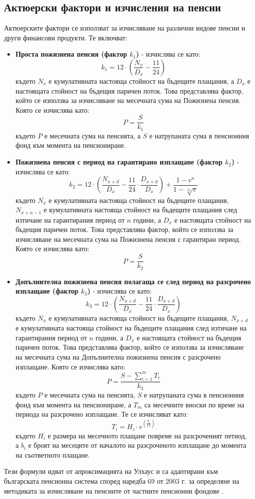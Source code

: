 \documentclass[a4paper,12pt]{article}
\begin{document}
\subsection{Актюерски фактори и изчисления на пенсии}
Актюерските фактори се използват за изчисляване на различни видове пенсии и други финансови продукти. Те включват:
\begin{itemize}
        \item \textbf{Проста пожизнена пенсия (фактор $k_1$)} - изчислява се като:
              \[k_1 = 12\cdot\left(\frac{N_{x}}{D_{x}}-\frac{11}{24}\right)\]
              където $N_x$ е кумулативната настояща стойност на бъдещите плащания, а $D_x$ е настоящата стойност на бъдещия паричен поток. Това представлява фактор, който се използва за изчисляване на месечната сума на Пожизнена пенсия. Която се изчислява като:
              \[P = \frac{S}{k_1}\]
              където $P$ е месечната сума на пенсията, а $S$ е натрупаната сума в пенсионния фонд към момента на пенсиониране.
        \item \textbf{Пожизнена пенсия с  период на гарантирано изплащане (фактор $k_2$)} - изчислява се като:
              \[k_2 = 12\cdot\left(\frac{N_{x+d}}{D_x} - \frac{11}{24}\cdot \frac{D_{x+d}}{D_{x}}\right)+\frac{1-v^n}{1-\sqrt[12]{v}}\]
              където $N_x$ е кумулативната настояща стойност на бъдещите плащания, $N_{x+n-1}$ е кумулативната настояща стойност на бъдещите плащания след изтичане на гарантирания период от $n$ години, а $D_x$ е настоящата стойност на бъдещия паричен поток. Това представлява фактор, който се използва за изчисляване на месечната сума на Пожизнена пенсия с гарантиран период. Която се изчислява като:
              \[P = \frac{S}{k_2}\]
        \item \textbf{Допълнителна пожизнена пенсия полагаща се след период на разсрочено изплащане (фактор $k_3$)} - изчислява се като:
              \[k_3 = 12\cdot\left(\frac{N_{x+d}}{D_{x}} - \frac{11}{24}\cdot\frac{
                              D_{x+d}}{D_{x}}\right)\]
              където $N_x$ е кумулативната настояща стойност на бъдещите плащания, $N_{x+d}$ е кумулативната настояща стойност на бъдещите плащания след изтичане на гарантирания период от $n$ години, а $D_x$ е настоящата стойност на бъдещия паричен поток. Това представлява фактор, който се използва за изчисляване на месечната сума на Допълнителна пожизнена пенсия с разсрочено изплащане. Която се изчислява като:
              \[P = \frac{S-\sum_{i=1}^{m}T_i}{k_3}\]
              където $P$ е месечната сума на пенсията, $S$ е натрупаната сума в пенсионния фонд към момента на пенсиониране, а $T_m$ са месечните вноски по време на периода на разсрочено изплащане. Те се изчисляват като:
              \[T_i= H_i \cdot v^{(\frac{b_i}{12})}\]
              където $H_i$ е размера на месечното плащане повреме на разсроченият петиод, а $b_i$ е броят на месеците от началото на разсроченото изплащане до момента на съответното плащане.
\end{itemize}
Тези формули идват от апроксимацията на Улхаус \cite{ulhous1956} и са адаптирани към българската пенсионна система според наредба 69 от 2003 г. за определяне на методиката за изчисляване на пенсиите от частните пенсионни фондове \cite{NOI_Official}.
\end{document}

